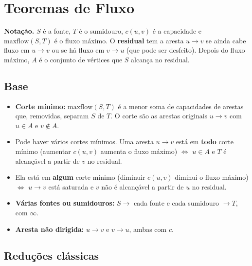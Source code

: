 \section{Teoremas de Fluxo}

\textbf{Notação.} $S$ é a fonte, $T$ é o sumidouro, $c(u, v)$ é a capacidade e $\text{maxflow}(S, T)$ é o fluxo
máximo. O \textbf{residual} tem a aresta $u \to v$ se ainda cabe fluxo em $u \to v$ ou se há fluxo em $v \to u$
(que pode ser desfeito). Depois do fluxo máximo, $A$ é o conjunto de vértices que $S$ alcança no residual.

\subsection*{Base}

\begin{itemize}
  \item \textbf{Corte mínimo:} $\text{maxflow}(S, T)$ é a menor soma de capacidades de arestas que, removidas,
        separam $S$ de $T$. O corte são as arestas originais $u \to v$ com $u \in A$ e $v \notin A$.
  \item Pode haver vários cortes mínimos. Uma aresta $u \to v$ está em \textbf{todo} corte mínimo (aumentar
        $c(u, v)$ aumenta o fluxo máximo) $\iff$ $u \in A$ e $T$ é alcançável a partir de $v$ no residual.
  \item Ela está em \textbf{algum} corte mínimo (diminuir $c(u, v)$ diminui o fluxo máximo) $\iff$ $u \to v$ está
        saturada e $v$ não é alcançável a partir de $u$ no residual.
  \item \textbf{Várias fontes ou sumidouros:} $S \to$ cada fonte e cada sumidouro $\to T$, com $\infty$.
  \item \textbf{Aresta não dirigida:} $u \to v$ e $v \to u$, ambas com $c$.
\end{itemize}

\subsection*{Reduções clássicas}

